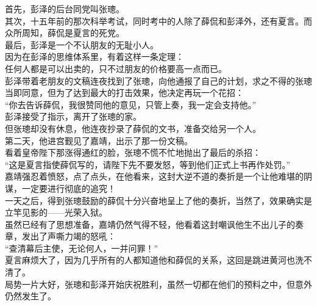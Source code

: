 \begin{multicols}{\theparacolNo}
首先，彭泽的后台同党叫张璁。\\

其次，十五年前的那次科举考试，同时考中的人除了薛侃和彭泽外，还有夏言。而众所周知，薛侃是夏言的死党。\\

最后，彭泽是一个不认朋友的无耻小人。\\

因为在彭泽的思维体系里，有着这样一条定理：\\

任何人都是可以出卖的，只不过朋友的价格要高一点而已。\\

彭泽带着老朋友的文稿连夜找到了张璁，向他通报了自己的计划，求之不得的张璁当即同意，但为了达到最大的打击效果，他决定再玩一个花招：\\

“你去告诉薛侃，我很赞同他的意见，只管上奏，我一定会支持他。”\\

彭泽接受了指示，离开了张璁的家。\\

但张璁却没有休息，他连夜抄录了薛侃的文书，准备交给另一个人。\\

第二天，他进宫觐见了嘉靖，出示了那一份文稿。\\

看着皇帝陛下那涨得通红的脸，张璁不慌不忙地抛出了最后的杀招：\\

“这是夏言指使薛侃写的，请陛下先不要发怒，等到他们正式上书再作处罚。”\\

嘉靖强忍着愤怒，点了点头，在他看来，这封大逆不道的奏折是一个让他难堪的阴谋，一定要进行彻底的追究！\\

一天之后，得到张璁鼓励的薛侃十分兴奋地呈上了他的奏折，当然了，效果确实是立竿见影的——光荣入狱。\\

虽然已经有了思想准备，嘉靖仍然气得不轻，他看着这封嘲讽他生不出儿子的奏章，发出了声嘶力竭的怒吼：\\

“查清幕后主使，无论何人，一并问罪！”\\

夏言麻烦大了，因为几乎所有的人都知道他和薛侃的关系，这回是跳进黄河也洗不清了。\\

局势一片大好，张璁和彭泽开始庆祝胜利，虽然一切都在他们的预料之中，但意外仍然发生了。\\


\end{multicols}
